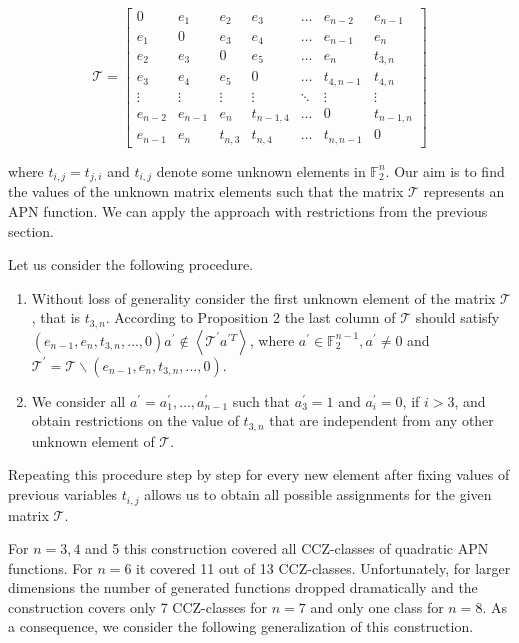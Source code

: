 \documentclass[10pt]{article}
\begin{document}
$$
\mathcal{T}=\left[\begin{array}{ccccccc}
0 & e_{1} & e_{2} & e_{3} & \ldots & e_{n-2} & e_{n-1} \\
e_{1} & 0 & e_{3} & e_{4} & \ldots & e_{n-1} & e_{n} \\
e_{2} & e_{3} & 0 & e_{5} & \ldots & e_{n} & t_{3, n} \\
e_{3} & e_{4} & e_{5} & 0 & \ldots & t_{4, n-1} & t_{4, n} \\
\vdots & \vdots & \vdots & \vdots & \ddots & \vdots & \vdots \\
e_{n-2} & e_{n-1} & e_{n} & t_{n-1,4} & \ldots & 0 & t_{n-1, n} \\
e_{n-1} & e_{n} & t_{n, 3} & t_{n, 4} & \ldots & t_{n, n-1} & 0
\end{array}\right]
$$

where $t_{i, j}=t_{j, i}$ and $t_{i, j}$ denote some unknown elements in $\mathbb{F}_{2}^{n}$. Our aim is to find the values of the unknown matrix elements such that the matrix $\mathcal{T}$ represents an APN function. We can apply the approach with restrictions from the previous section.

Let us consider the following procedure.

\begin{enumerate}
  \item Without loss of generality consider the first unknown element of the matrix $\mathcal{T}$, that is $t_{3, n}$. According to Proposition 2 the last column of $\mathcal{T}$ should satisfy $\left(e_{n-1}, e_{n}, t_{3, n}, \ldots, 0\right) a^{\prime} \notin\left\langle\mathcal{T}^{\prime} a^{\prime T}\right\rangle$, where $a^{\prime} \in \mathbb{F}_{2}^{n-1}, a^{\prime} \neq 0$ and $\mathcal{T}^{\prime}=\mathcal{T} \backslash\left(e_{n-1}, e_{n}, t_{3, n}, \ldots, 0\right)$.
  \item We consider all $a^{\prime}=a_{1}^{\prime}, \ldots, a_{n-1}^{\prime}$ such that $a_{3}^{\prime}=1$ and $a_{i}^{\prime}=0$, if $i>3$, and obtain restrictions on the value of $t_{3, n}$ that are independent from any other unknown element of $\mathcal{T}$.
\end{enumerate}

Repeating this procedure step by step for every new element after fixing values of previous variables $t_{i, j}$ allows us to obtain all possible assignments for the given matrix $\mathcal{T}$.

For $n=3,4$ and 5 this construction covered all CCZ-classes of quadratic APN functions. For $n=6$ it covered 11 out of 13 CCZ-classes. Unfortunately, for larger dimensions the number of generated functions dropped dramatically and the construction covers only 7 CCZ-classes for $n=7$ and only one class for $n=8$. As a consequence, we consider the following generalization of this construction.
\end{document}
